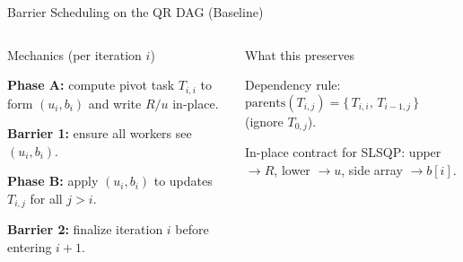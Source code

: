\begin{frame}{Barrier Scheduling on the QR DAG (Baseline)}
\footnotesize
\begin{columns}[T,onlytextwidth]


  \begin{block}{Mechanics (per iteration $i$)}
    \begin{tightitem}
      \item \textbf{Phase A:} compute pivot task $T_{i,i}$ to form $(u_i,b_i)$ and write $R/u$ in-place.
      \item \textbf{Barrier 1:} ensure all workers see $(u_i,b_i)$.
      \item \textbf{Phase B:} apply $(u_i,b_i)$ to updates $T_{i,j}$ for all $j>i$.
      \item \textbf{Barrier 2:} finalize iteration $i$ before entering $i{+}1$.
    \end{tightitem}
  \end{block}

    \begin{block}{What this preserves}
    \begin{tightitem}
      \item Dependency rule: $\mathrm{parents}(T_{i,j})=\{\,T_{i,i},\,T_{i-1,j}\,\}$ \;(ignore $T_{0,j}$).
      \item In-place contract for SLSQP: upper $\rightarrow R$, lower $\rightarrow u$, side array $\rightarrow b[i]$.
    \end{tightitem}
  \end{block}

\centering
\end{columns}
\end{frame}
